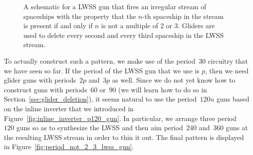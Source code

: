 \begin{figure}[!htb]
	\centering
	\caption{A schematic for a LWSS gun that fires an irregular stream of spaceships with the property that the $n$-th spaceship in the stream is present if and only if $n$ is not a multiple of $2$ or $3$. Gliders are used to delete every second and every third spaceship in the LWSS stream.}
	\label{fig:period_not_2_3_lwss_gun_schematic}
\end{figure}

To actually construct such a pattern, we make use of the period~$30$ circuitry that we have seen so far. If the period of the LWSS gun that we use is $p$, then we need glider guns with periods~$2p$ and~$3p$ as well. Since we do not yet know how to construct guns with periods~$60$ or~$90$ (we will learn how to do so in Section~\ref{sec:glider_deletion}), it seems natural to use the period~$120n$ guns based on the inline inverter that we introduced in Figure~\ref{fig:inline_inverter_p120_gun}. In particular, we arrange three period~$120$ guns so as to synthesize the LWSS and then aim period~$240$ and~$360$ guns at the resulting LWSS stream in order to thin it out. The final pattern is displayed in Figure~\ref{fig:period_not_2_3_lwss_gun}.

